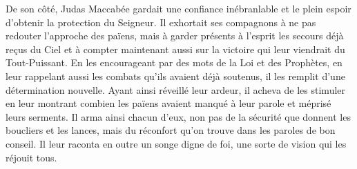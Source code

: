 De son côté, Judas Maccabée gardait une confiance inébranlable
	et le plein espoir d’obtenir la protection du Seigneur.
Il exhortait ses compagnons à ne pas redouter l’approche des païens,
	mais à garder présents à l’esprit les secours déjà reçus du Ciel
	et à compter maintenant aussi sur la victoire qui leur viendrait du Tout-Puissant.
En les encourageant par des mots de la Loi et des Prophètes,
	en leur rappelant aussi les combats qu’ils avaient déjà soutenus,
	il les remplit d’une détermination nouvelle.
Ayant ainsi réveillé leur ardeur,
	il acheva de les stimuler en leur montrant combien les païens
		avaient manqué à leur parole et méprisé leurs serments.
Il arma ainsi chacun d’eux,
	non pas de la sécurité que donnent les boucliers et les lances,
	mais du réconfort qu’on trouve dans les paroles de bon conseil.
Il leur raconta en outre un songe digne de foi, une sorte de vision qui les réjouit tous.
